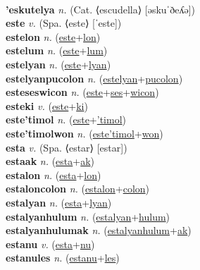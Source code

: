  \label{es} \\
\textbf{'eskutelya} \textit{n.} (Cat. ⟨escudella⟩ [əskuˈðeʎə])
 \label{'eskutelya} \\
\textbf{este} \textit{v.} (Spa. ⟨este⟩ [ˈeste])
 \label{este} \\
\textbf{estelon} \textit{n.} (\hyperref[este]{este}+\hyperref[lon]{lon})
 \label{estelon} \\
\textbf{estelum} \textit{n.} (\hyperref[este]{este}+\hyperref[lum]{lum})
 \label{estelum} \\
\textbf{estelyan} \textit{n.} (\hyperref[este]{este}+\hyperref[lyan]{lyan})
 \label{estelyan} \\
\textbf{estelyanpucolon} \textit{n.} (\hyperref[estelyan]{estelyan}+\hyperref[pucolon]{pucolon})
 \label{estelyanpucolon} \\
\textbf{esteseswicon} \textit{n.} (\hyperref[este]{este}+\hyperref[ses]{ses}+\hyperref[wicon]{wicon})
 \label{esteseswicon} \\
\textbf{esteki} \textit{v.} (\hyperref[este]{este}+\hyperref[ki]{ki})
 \label{esteki} \\
\textbf{este'timol} \textit{n.} (\hyperref[este]{este}+\hyperref['timol]{'timol})
 \label{este'timol} \\
\textbf{este'timolwon} \textit{n.} (\hyperref[este'timol]{este'timol}+\hyperref[won]{won})
 \label{este'timolwon} \\
\textbf{esta} \textit{v.} (Spa. ⟨estar⟩ [estar])
 \label{esta} \\
\textbf{estaak} \textit{n.} (\hyperref[esta]{esta}+\hyperref[ak]{ak})
 \label{estaak} \\
\textbf{estalon} \textit{n.} (\hyperref[esta]{esta}+\hyperref[lon]{lon})
 \label{estalon} \\
\textbf{estaloncolon} \textit{n.} (\hyperref[estalon]{estalon}+\hyperref[colon]{colon})
 \label{estaloncolon} \\
\textbf{estalyan} \textit{n.} (\hyperref[esta]{esta}+\hyperref[lyan]{lyan})
 \label{estalyan} \\
\textbf{estalyanhulum} \textit{n.} (\hyperref[estalyan]{estalyan}+\hyperref[hulum]{hulum})
 \label{estalyanhulum} \\
\textbf{estalyanhulumak} \textit{n.} (\hyperref[estalyanhulum]{estalyanhulum}+\hyperref[ak]{ak})
 \label{estalyanhulumak} \\
\textbf{estanu} \textit{v.} (\hyperref[esta]{esta}+\hyperref[nu]{nu})
 \label{estanu} \\
\textbf{estanules} \textit{n.} (\hyperref[estanu]{estanu}+\hyperref[les]{les})
